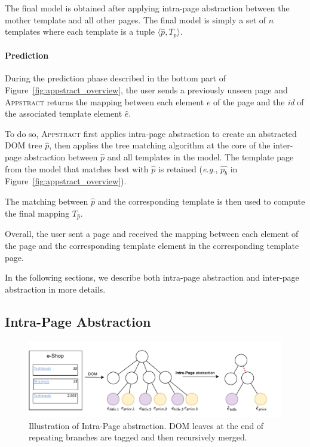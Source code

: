 The final model is obtained after applying intra-page abstraction between the mother template and all other pages.
The final model is simply a set of $n$ templates where each template is a tuple $\langle \hat{p}, T_{p} \rangle$.

\paragraph{Prediction}
During the prediction phase described in the bottom part of Figure~\ref{fig:appstract_overview}, the user sends a previously unseen page and \textsc{Appstract} returns the mapping between each element $e$ of the page and the \textit{id} of the associated template element $\hat{e}$.

To do so, \textsc{Appstract} first applies intra-page abstraction to create an abstracted DOM tree $\hat{p}$, then applies the tree matching algorithm at the core of the inter-page abstraction between $\hat{p}$ and all templates in the model.
The template page from the model that matches best with $\hat{p}$ is retained (\emph{e.g.}, $\hat{p_b}$ in Figure~\ref{fig:appstract_overview}).

The matching between $\hat{p}$ and the corresponding template is then used to compute the final mapping $T_{\hat{p}}$.

Overall, the user sent a page and received the mapping between each element of the page and the corresponding template element in the corresponding template page.

In the following sections, we describe both intra-page abstraction and inter-page abstraction in more details.

\subsection{Intra-Page Abstraction}

\begin{figure}[ht]
  \centering
  \includegraphics[width=0.8\linewidth]{appstract/explanations/intra}
  \caption{Illustration of Intra-Page abstraction. DOM leaves at the end of repeating branches are tagged and then recursively merged.}
  \label{fig:intra}
\end{figure}

